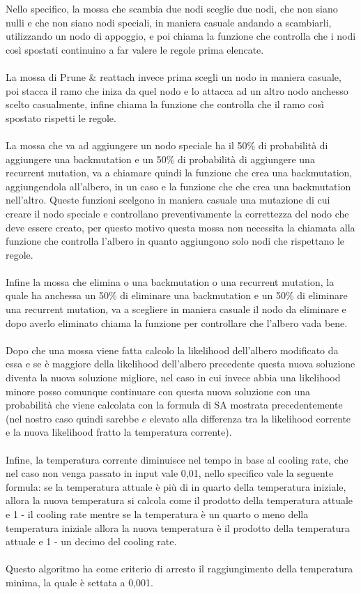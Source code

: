 \documentclass[12pt]{report}
\begin{document}
  Nello specifico, la mossa che scambia due nodi sceglie due nodi, che non siano nulli e che non siano nodi speciali, in maniera casuale andando a scambiarli, utilizzando un nodo di appoggio, e poi chiama la funzione che controlla che i nodi così spostati continuino a far valere le regole prima elencate.\\\\
  La mossa di Prune \& reattach invece prima scegli un nodo in maniera casuale, poi stacca il ramo che iniza da quel nodo e lo attacca ad un altro nodo anchesso scelto casualmente, infine chiama la funzione che controlla che il ramo così spostato rispetti le regole.\\\\
  La mossa che va ad aggiungere un nodo speciale ha il 50\% di probabilità di aggiungere una backmutation e un 50\% di probabilità di aggiungere una recurrent mutation, va a chiamare quindi la funzione che crea una backmutation, aggiungendola all'albero, in un caso e la funzione che che crea una backmutation nell'altro.
  Queste funzioni scelgono in maniera casuale una mutazione di cui creare il nodo speciale e controllano preventivamente la correttezza del nodo che deve essere creato, per questo motivo questa mossa non necessita la chiamata alla funzione che controlla l'albero in quanto aggiungono solo nodi che rispettano le regole.\\\\
  Infine la mossa che elimina o una backmutation o una recurrent mutation, la quale ha anchessa un 50\% di eliminare una backmutation e un 50\% di eliminare una recurrent mutation, va a scegliere in maniera casuale il nodo da eliminare e dopo averlo eliminato chiama la funzione per controllare che l'albero vada bene.\\\\
  Dopo che una mossa viene fatta calcolo la likelihood dell'albero modificato da essa e se è maggiore della likelihood dell'albero precedente questa nuova soluzione diventa la nuova soluzione migliore, nel caso in cui invece abbia una likelihood minore posso comunque continuare con questa nuova soluzione con una probabilità che viene calcolata con la formula di SA mostrata precedentemente (nel nostro caso quindi sarebbe $e$ elevato alla differenza tra la likelihood corrente e la nuova likelihood fratto la temperatura corrente).\\\\
  Infine, la temperatura corrente diminuisce nel tempo in base al cooling rate, che nel caso non venga passato in input vale 0,01, nello specifico vale la seguente formula: se la temperatura attuale è più di in quarto della temperatura iniziale, allora la nuova temperatura si calcola come il prodotto della temperatura attuale e 1 - il cooling rate mentre se la temperatura è un quarto o meno della temperatura iniziale allora la nuova temperatura è il prodotto della temperatura attuale e 1 - un decimo del cooling rate.\\\\
  Questo algoritmo ha come criterio di arresto il raggiungimento della temperatura minima, la quale è settata a 0,001.
\end{document}
